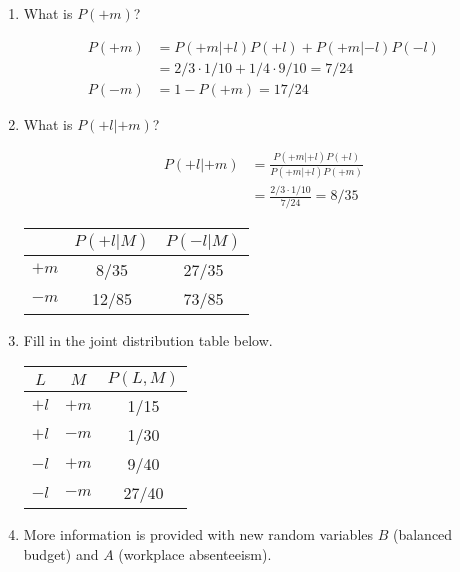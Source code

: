 \documentclass[12pt]{article}
\begin{document}
\begin{enumerate}

\item What is $P(+m)$?

\begin{align*}
P(+m) &= P(+m|+l)P(+l) + P(+m|-l)P(-l)\\
      &= 2/3 \cdot 1/10 + 1/4 \cdot 9/10 = 7/24\\
P(-m) &= 1 - P(+m) = 17/24
\end{align*}
\item What is $P(+l | +m)$?

\begin{align*}
P(+l|+m) &= \frac{P(+m|+l)P(+l)}{P(+m|+l)P(+m)}\\
         &= \frac{2/3 \cdot 1/10}{7/24} = 8/35
\end{align*}

\begin{center}
\begin{tabular}{|c|c|c|} \hline
     & $P(+l | M)$ & $P(-l | M)$ \\ \hline
$+m$ & 8/35       & 27/35   \\ \hline
$-m$ & 12/85        & 73/85 \\ \hline
\end{tabular}
\end{center}

\item Fill in the joint distribution table below.

\begin{center}
\begin{tabular}{|c|c||c|} \hline
$L$  & $M$   & $P(L, M)$ \\ \hline \hline
$+l$ & $+m$  & 1/15   \\ \hline
$+l$ & $-m$  & 1/30 \\ \hline
$-l$ & $+m$  & 9/40  \\ \hline
$-l$ & $-m$  & 27/40 \\ \hline
\end{tabular}
\end{center}

\item More information is provided with new random variables $B$
  (balanced budget) and $A$ (workplace absenteeism).


\end{enumerate}
\end{document}
